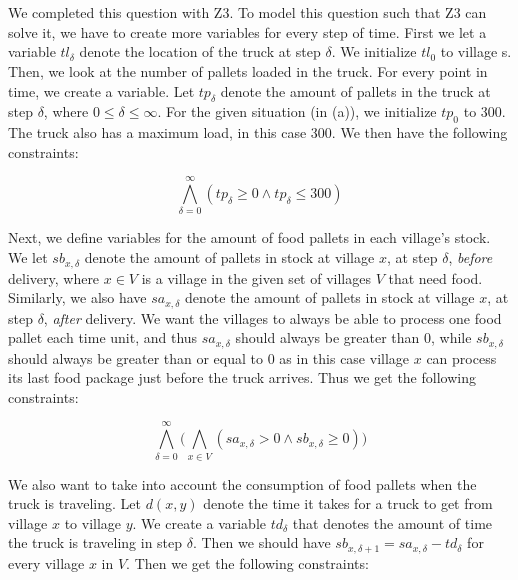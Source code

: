 \chapter{}\label{chp:1}
We completed this question with Z3. To model this question such that Z3 can solve it, we have to create more variables for every step of time. First we let a variable $tl_{\delta}$ denote the location of the truck at step $\delta$. We initialize $tl_0$ to village s. Then, we look at the number of pallets loaded in the truck. For every point in time, we create a variable. Let $tp_{\delta}$ denote the amount of pallets in the truck at step $\delta$, where $0 \leq \delta \leq \infty$. For the given situation (in (a)), we initialize $tp_0$ to 300. The truck also has a maximum load, in this case 300. We then have the following constraints:

\begin{equation}
    \label{maxload}
    \bigwedge^{\infty}_{\delta=0} (tp_{\delta} \geq 0 \wedge tp_{\delta} \leq 300)
\end{equation}

Next, we define variables for the amount of food pallets in each village's stock. We let $sb_{x,\delta}$ denote the amount of pallets in stock at village $x$, at step $\delta$, \textit{before} delivery, where $x \in V$ is a village in the given set of villages $V$ that need food. Similarly, we also have $sa_{x,\delta}$ denote the amount of pallets in stock at village $x$, at step $\delta$, \textit{after} delivery. We want the villages to always be able to process one food pallet each time unit, and thus $sa_{x, \delta}$ should always be greater than 0, while $sb_{x, \delta}$ should always be greater than or equal to 0 as in this case village $x$ can process its last food package just before the truck arrives. Thus we get the following constraints:

\begin{equation}
    \label{minfood}
    \bigwedge^{\infty}_{\delta=0}\bigg(\bigwedge_{x \in V} (sa_{x, \delta} > 0 \wedge sb_{x, \delta} \geq 0)\bigg)
\end{equation}

We also want to take into account the consumption of food pallets when the truck is traveling. Let $d(x,y)$ denote the time it takes for a truck to get from village $x$ to village $y$. We create a variable $td_{\delta}$ that denotes the amount of time the truck is traveling in step $\delta$. Then we should have $sb_{x, \delta+1} = sa_{x, \delta} - td_{\delta}$ for every village $x$ in $V$. Then we get the following constraints:


